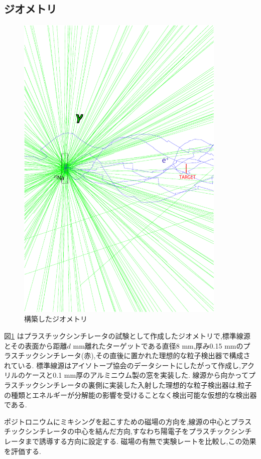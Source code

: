 \subsection{ジオメトリ}

\begin{figure}[!tbp]
	\centering
		\includegraphics[width=10cm]{img/test1_geometry.pdf}
	\caption{構築したジオメトリ}
	\label{test1_geometry}
\end{figure}

図\ref{test1_geometry} はプラスチックシンチレータの試験として作成したジオメトリで,標準線源とその表面から距離$d$ mm離れたターゲットである直径8 mm,厚み0.15 mmのプラスチックシンチレータ(赤),その直後に置かれた理想的な粒子検出器で構成されている.
標準線源はアイソトープ協会のデータシートにしたがって作成し,アクリルのケースと0.1 mm厚のアルミニウム製の窓を実装した.
線源から向かってプラスチックシンチレータの裏側に実装した入射した理想的な粒子検出器は,粒子の種類とエネルギーが分解能の影響を受けることなく検出可能な仮想的な検出器である.

ポジトロニウムにミキシングを起こすための磁場の方向を,線源の中心とプラスチックシンチレータの中心を結んだ方向,すなわち陽電子をプラスチックシンチレータまで誘導する方向に設定する.
磁場の有無で実験レートを比較し,この効果を評価する.


